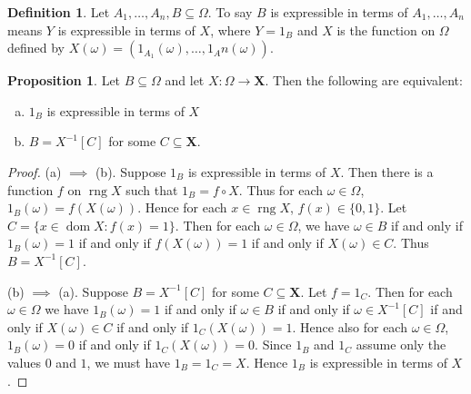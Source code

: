 \documentclass{article}
\DeclareMathOperator{\dom}{dom}
\DeclareMathOperator{\rng}{rng}
\theoremstyle{definition}
\newtheorem{proposition}[theorem]{Proposition}
\newtheorem*{definition}{Definition}
\begin{document}
\begin{definition}
Let $A_1, \ldots, A_n, B \subseteq \Omega$. To say $B$ is expressible in terms of $A_1, \ldots, A_n$ means $Y$ is expressible in terms of $X$, where $Y = 1_B$ and $X$ is the function on $\Omega$ defined by $X(\omega) = (1_{A_1}(\omega), \ldots, 1_An(\omega))$.
\end{definition}

\begin{proposition}
Let $B \subseteq \Omega$ and let $X: \Omega \longrightarrow \mathbf{X}$. Then the following are equivalent:
\begin{enumerate}[(a)]
    \item $1_B$ is expressible in terms of $X$
    \item $B = X^{-1}[C]$ for some $C \subseteq \mathbf{X}$.
\end{enumerate}
\end{proposition}
\begin{proof}
    (a) $\implies$ (b). Suppose $1_B$ is expressible in terms of $X$. Then there is a function $f$ on $\rng X$ such that $1_B = f \circ X$. Thus for each $\omega \in \Omega$, $1_B(\omega) = f(X(\omega))$. Hence for each $x \in \rng X$, $f(x) \in \{0, 1\}$. Let $C = \{x \in \dom X : f(x) = 1\}$.
    Then for each $\omega \in \Omega$, we have $\omega \in B$ if and only if $1_B(\omega) = 1$ if and only if $f(X(\omega)) = 1$ if and only if $X(\omega) \in C$. Thus $B = X^{-1}[C]$.
    
    (b) $\implies$ (a). Suppose $B = X^{-1}[C]$ for some $C \subseteq \mathbf{X}$. Let $f = 1_C$. Then for each $\omega \in \Omega$ we have $1_B(\omega) = 1$ if and only if $\omega \in B$ if and only if $\omega \in X^{-1}[C]$ if and only if $X(\omega) \in C$ if and only if $1_C(X(\omega)) = 1$. Hence also for each $\omega \in \Omega$, $1_B(\omega) = 0$ if and only if $1_C(X(\omega)) = 0$. Since $1_B$ and $1_C$ assume only the values $0$ and $1$, we must have $1_B = 1_C = X$. Hence $1_B$ is expressible in terms of $X$.
\end{proof}
\end{document}
